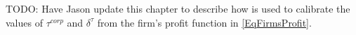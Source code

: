 
TODO: Have Jason update this chapter to describe how \btax is used to calibrate the values of $\tau^{corp}$ and $\delta^\tau$ from the firm's profit function in \eqref{EqFirmsProfit}.
